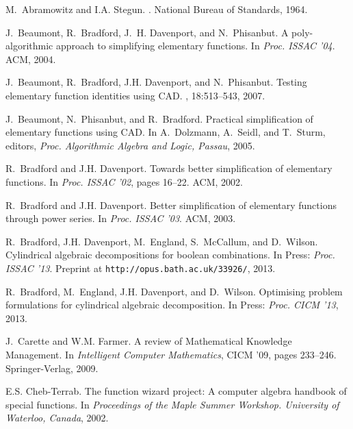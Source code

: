 \documentclass{llncs}
\begin{document}
\begin{thebibliography}{10}

M.~Abramowitz and I.A. Stegun.
.
\newblock National Bureau of Standards, 1964.

J.~Beaumont, R.~Bradford, J.~H. Davenport, and N.~Phisanbut.
\newblock A poly-algorithmic approach to simplifying elementary functions.
\newblock In {\em Proc. ISSAC '04}. ACM, 2004.

J.~Beaumont, R.~Bradford, J.H. Davenport, and N.~Phisanbut.
\newblock Testing elementary function identities using {CAD}.
,
  18:513--543, 2007.

J.~Beaumont, N.~Phisanbut, and R.~Bradford.
\newblock Practical simplification of elementary functions using {CAD}.
\newblock In A.~Dolzmann, A.~Seidl, and T.~Sturm, editors, {\em Proc.
  Algorithmic Algebra and Logic, Passau}, 2005.

R.~Bradford and J.H. Davenport.
\newblock Towards better simplification of elementary functions.
\newblock In {\em Proc. ISSAC '02}, pages 16--22. ACM, 2002.

R.~Bradford and J.H. Davenport.
\newblock Better simplification of elementary functions through power series.
\newblock In {\em Proc. ISSAC '03}. ACM, 2003.

R.~Bradford, J.H. Davenport, M.~England, S.~McCallum, and D.~Wilson.
\newblock Cylindrical algebraic decompositions for boolean combinations.
\newblock In Press: {\em Proc. ISSAC '13}. Preprint at
  \texttt{http://opus.bath.ac.uk/33926/}, 2013.

R.~Bradford, M.~England, J.H. Davenport, and D.~Wilson.
\newblock Optimising problem formulations for cylindrical algebraic
  decomposition.
\newblock In Press: {\em Proc. CICM '13}, 2013.

J.~Carette and W.M. Farmer.
\newblock A review of {M}athematical {K}nowledge {M}anagement.
\newblock In {\em Intelligent Computer Mathematics}, CICM '09, pages 233--246.
  Springer-Verlag, 2009.

E.S. Cheb-Terrab.
\newblock The function wizard project: A computer algebra handbook of special
  functions.
\newblock In {\em Proceedings of the Maple Summer Workshop. University of
  Waterloo, Canada}, 2002.


\end{thebibliography}
\end{document}
